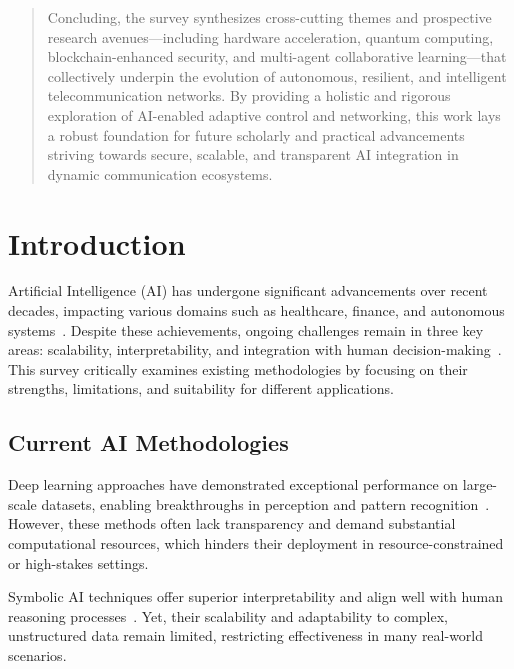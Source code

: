 \documentclass[sigconf]{acmart}
\begin{document}
\begin{abstract}
Concluding, the survey synthesizes cross-cutting themes and prospective research avenues—including hardware acceleration, quantum computing, blockchain-enhanced security, and multi-agent collaborative learning—that collectively underpin the evolution of autonomous, resilient, and intelligent telecommunication networks. By providing a holistic and rigorous exploration of AI-enabled adaptive control and networking, this work lays a robust foundation for future scholarly and practical advancements striving towards secure, scalable, and transparent AI integration in dynamic communication ecosystems.
\end{abstract}

\maketitle

\section{Introduction}

Artificial Intelligence (AI) has undergone significant advancements over recent decades, impacting various domains such as healthcare, finance, and autonomous systems~\cite{smith2020advances}. Despite these achievements, ongoing challenges remain in three key areas: scalability, interpretability, and integration with human decision-making~\cite{johnson2019challenges}. This survey critically examines existing methodologies by focusing on their strengths, limitations, and suitability for different applications.

\subsection{Current AI Methodologies}

Deep learning approaches have demonstrated exceptional performance on large-scale datasets, enabling breakthroughs in perception and pattern recognition~\cite{liu2021deep}. However, these methods often lack transparency and demand substantial computational resources, which hinders their deployment in resource-constrained or high-stakes settings.

Symbolic AI techniques offer superior interpretability and align well with human reasoning processes~\cite{miller2018symbolic}. Yet, their scalability and adaptability to complex, unstructured data remain limited, restricting effectiveness in many real-world scenarios.
\end{document}
